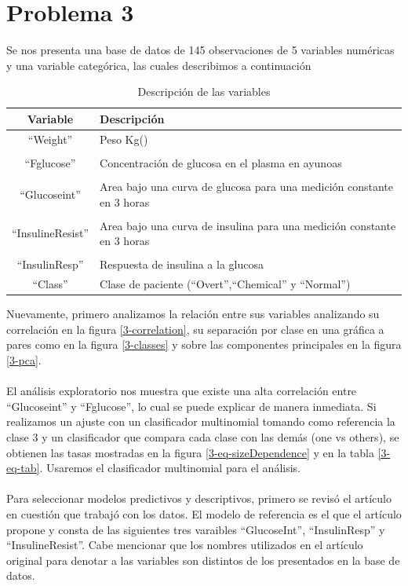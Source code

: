 \documentclass[11pt]{article}
\begin{document}
\section{Problema 3}
Se nos presenta una base de datos de 145 observaciones de 5 variables numéricas y una variable categórica, las cuales describimos a continuación
\begin{table}[H]
    \centering
    \begin{tabular}{c|p{8cm}}
        Variable & Descripción \\
        \hline
        ``Weight'' & Peso Kg() \\
        & \\
        ``Fglucose'' & Concentración de glucosa en el plasma en ayunoas \\
        & \\
        ``Glucoseint'' &  Area bajo una curva de glucosa para una medición constante en 3 horas\\
        & \\
        ``InsulineResist'' & Area bajo una curva de insulina para una medición constante en 3 horas \\
        & \\
        ``InsulinResp'' & Respuesta de insulina a la glucosa \\
        ``Class'' & Clase de paciente (``Overt'',``Chemical'' y  ``Normal'')\\
    \end{tabular}
    \caption{Descripción de las variables}
    \label{1-desc}
\end{table}
Nuevamente, primero analizamos la relación entre sus variables analizando su correlación en la figura \ref{3-correlation}, su separación por clase en una gráfica a pares como en la figura \ref{3-classes}  y sobre las componentes principales en la figura \ref{3-pca}.
\\
\\El análisis exploratorio nos muestra que existe una alta correlación entre ``Glucoseint'' y ``Fglucose'', lo cual se puede explicar de manera inmediata. Si realizamos un ajuste con un clasificador multinomial tomando como referencia la clase 3 y un clasificador que compara cada clase con las demás (one vs others), se obtienen las tasas mostradas en la figura \ref{3-eq-sizeDependence} y en la tabla \ref{3-eq-tab}. Usaremos el clasificador multinomial para el análisis.
\\
\\Para seleccionar modelos predictivos y descriptivos, primero se revisó el artículo en cuestión \cite{3-3} que trabajó con los datos. El modelo de referencia es el que el artículo propone y consta de las siguientes tres varaibles  ``GlucoseInt'', ``InsulinResp'' y  ``InsulineResist''. Cabe mencionar que los nombres utilizados en el artículo original para denotar a las variables son distintos de los presentados en la base de datos. 
\end{document}
